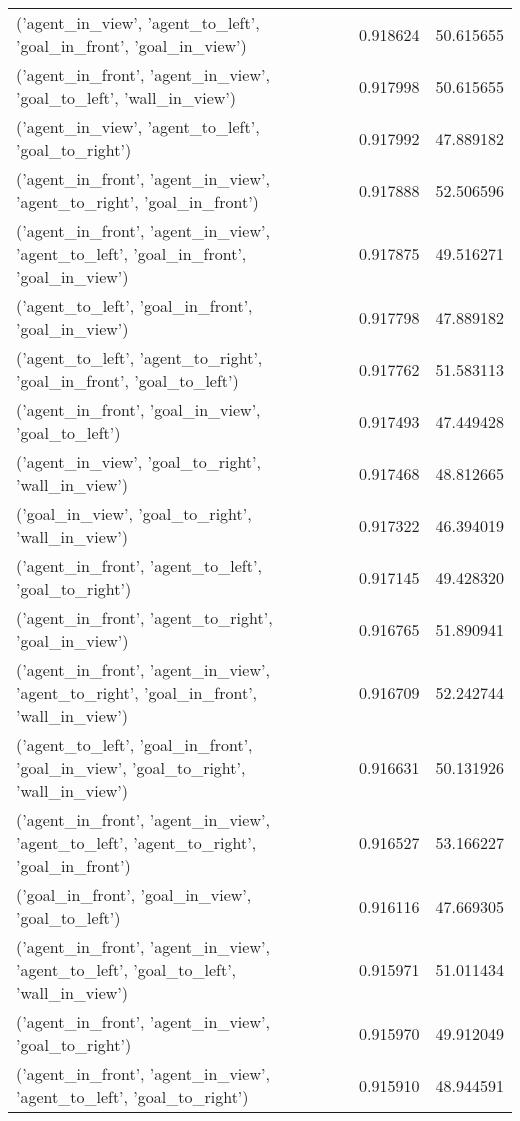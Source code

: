 \begin{tabular}{lrr}
('agent\_in\_view', 'agent\_to\_left', 'goal\_in\_front', 'goal\_in\_view') & 0.918624 & 50.615655 \\
('agent\_in\_front', 'agent\_in\_view', 'goal\_to\_left', 'wall\_in\_view') & 0.917998 & 50.615655 \\
('agent\_in\_view', 'agent\_to\_left', 'goal\_to\_right') & 0.917992 & 47.889182 \\
('agent\_in\_front', 'agent\_in\_view', 'agent\_to\_right', 'goal\_in\_front') & 0.917888 & 52.506596 \\
('agent\_in\_front', 'agent\_in\_view', 'agent\_to\_left', 'goal\_in\_front', 'goal\_in\_view') & 0.917875 & 49.516271 \\
('agent\_to\_left', 'goal\_in\_front', 'goal\_in\_view') & 0.917798 & 47.889182 \\
('agent\_to\_left', 'agent\_to\_right', 'goal\_in\_front', 'goal\_to\_left') & 0.917762 & 51.583113 \\
('agent\_in\_front', 'goal\_in\_view', 'goal\_to\_left') & 0.917493 & 47.449428 \\
('agent\_in\_view', 'goal\_to\_right', 'wall\_in\_view') & 0.917468 & 48.812665 \\
('goal\_in\_view', 'goal\_to\_right', 'wall\_in\_view') & 0.917322 & 46.394019 \\
('agent\_in\_front', 'agent\_to\_left', 'goal\_to\_right') & 0.917145 & 49.428320 \\
('agent\_in\_front', 'agent\_to\_right', 'goal\_in\_view') & 0.916765 & 51.890941 \\
('agent\_in\_front', 'agent\_in\_view', 'agent\_to\_right', 'goal\_in\_front', 'wall\_in\_view') & 0.916709 & 52.242744 \\
('agent\_to\_left', 'goal\_in\_front', 'goal\_in\_view', 'goal\_to\_right', 'wall\_in\_view') & 0.916631 & 50.131926 \\
('agent\_in\_front', 'agent\_in\_view', 'agent\_to\_left', 'agent\_to\_right', 'goal\_in\_front') & 0.916527 & 53.166227 \\
('goal\_in\_front', 'goal\_in\_view', 'goal\_to\_left') & 0.916116 & 47.669305 \\
('agent\_in\_front', 'agent\_in\_view', 'agent\_to\_left', 'goal\_to\_left', 'wall\_in\_view') & 0.915971 & 51.011434 \\
('agent\_in\_front', 'agent\_in\_view', 'goal\_to\_right') & 0.915970 & 49.912049 \\
('agent\_in\_front', 'agent\_in\_view', 'agent\_to\_left', 'goal\_to\_right') & 0.915910 & 48.944591 \\

\end{tabular}
